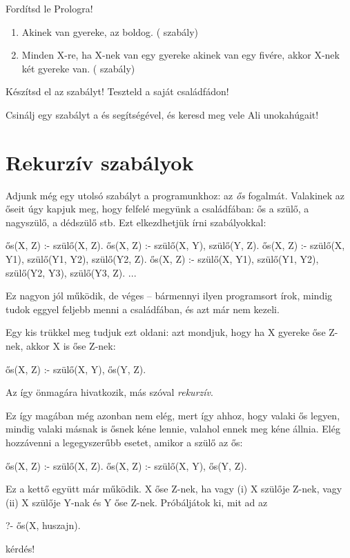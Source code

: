 \begin{problem}
Fordítsd le Prologra!
\begin{enumerate}  
\item Akinek van gyereke, az boldog. (
  szabály)
\item Minden X-re, ha X-nek van egy gyereke akinek
  van egy fivére, akkor X-nek két gyereke
  van. ( szabály)
\end{enumerate}
\end{problem}
\begin{problem}
  Készítsd el az  szabályt!
  Teszteld a saját családfádon!
\end{problem}
\begin{problem}
  Csinálj egy  szabályt a 
  és  segítségével, és keresd meg vele Ali
  unokahúgait!
\end{problem}

\section{Rekurzív szabályok}
Adjunk még egy utolsó szabályt a programunkhoz: az
\emph{ős} fogalmát. Valakinek az őseit úgy kapjuk
meg, hogy felfelé megyünk a családfában: ős a szülő,
a nagyszülő, a dédszülő stb. Ezt elkezdhetjük írni
szabályokkal:
\begin{program}
ős(X, Z) :- szülő(X, Z).
ős(X, Z) :- szülő(X, Y), szülő(Y, Z).
ős(X, Z) :-
    szülő(X, Y1), szülő(Y1, Y2), szülő(Y2, Z).
ős(X, Z) :-
    szülő(X, Y1), szülő(Y1, Y2),
    szülő(Y2, Y3), szülő(Y3, Z).
...
\end{program}
Ez nagyon jól működik, de véges -- bármennyi ilyen
programsort írok, mindig tudok eggyel feljebb menni
a családfában, és azt már nem kezeli.

Egy kis trükkel meg tudjuk ezt oldani: azt mondjuk,
hogy ha X gyereke őse Z-nek, akkor X is őse Z-nek:
\begin{program}
ős(X, Z) :- szülő(X, Y), ős(Y, Z).
\end{program}
Az  így önmagára hivatkozik, más szóval
\emph{rekurzív}.

Ez így magában még azonban nem elég, mert így ahhoz,
hogy valaki ős legyen, mindig valaki másnak is ősnek
kéne lennie, valahol ennek meg kéne állnia. Elég
hozzávenni a legegyszerűbb esetet, amikor a szülő az
ős:
\begin{program}
ős(X, Z) :- szülő(X, Z).
ős(X, Z) :- szülő(X, Y), ős(Y, Z).
\end{program}
Ez a kettő együtt már működik. X őse Z-nek, ha vagy
(i) X szülője Z-nek, vagy (ii) X szülője Y-nak és Y
őse Z-nek. Próbáljátok ki, mit ad az
\begin{query}
?- ős(X, huszajn).
\end{query}
kérdés!

